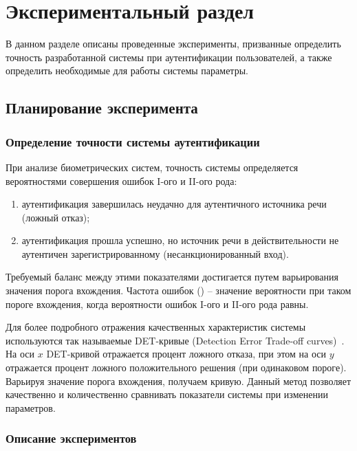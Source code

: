 \chapter{Экспериментальный раздел}
\label{sec:experiment}

В данном разделе описаны проведенные эксперименты, призванные определить
точность разработанной системы при аутентификации пользователей, а также
определить необходимые для работы системы параметры.

\section{Планирование эксперимента}

\subsection{Определение точности системы аутентификации}

При анализе биометрических систем, точность системы
определяется вероятностями совершения ошибок I-ого и II-ого рода:

\begin{enumerate}
\item аутентификация завершилась неудачно для аутентичного источника речи (ложный отказ);
\item аутентификация прошла успешно, но источник речи в действительности не аутентичен зарегистрированному (несанкционированный вход).
\end{enumerate}

Требуемый баланс между этими показателями достигается путем варьирования
значения порога вхождения. Частота ошибок () --
значение вероятности при таком пороге вхождения, когда вероятности ошибок I-ого
и II-ого рода равны.

Для более подробного отражения качественных характеристик системы используются
так называемые DET-кривые (Detection Error Trade-off curves)~\cite{Alvin97DET}. На оси $x$
DET-кривой отражается процент ложного отказа, при этом на оси $y$ отражается
процент ложного положительного решения (при одинаковом пороге). Варьируя
значение порога вхождения, получаем кривую. Данный метод позволяет качественно и
количественно сравнивать
показатели системы при изменении параметров.

\subsection{Описание экспериментов}

